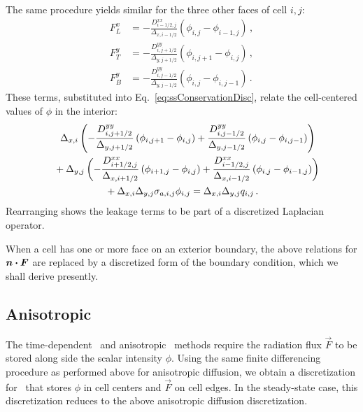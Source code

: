 The same procedure yields similar for the three other faces of cell $i,j$:
\begin{align*}
  F_L^x &= -\frac{D^{xx}_{i-1/2,j}}{\Delta_{x,i-1/2}}
  \left( \phi_{i,j} - \phi_{i-1,j} \right)\,,
  \\
  F_T^y &= -\frac{D^{yy}_{i,j+1/2}}{\Delta_{y,j+1/2}}
  \left( \phi_{i,j+1} - \phi_{i,j} \right)\,,
  \\
  F_B^y &= -\frac{D^{yy}_{i,j-1/2}}{\Delta_{y,j-1/2}}
  \left( \phi_{i,j} - \phi_{i,j-1} \right)\,.
\end{align*}
These terms, substituted into Eq.~\eqref{eq:ssConservationDisc}, relate the
cell-centered values of $\phi$ in the interior:
\begin{multline} \label{eq:diagConservation}
  \hphantom{ {}+{} }
  \Delta_{x,i} \left(
  - \frac{D^{yy}_{i,j+1/2}}{\Delta_{y,j+1/2}} \left( \phi_{i,j+1} - \phi_{i,j}
    \right)
  + \frac{D^{yy}_{i,j-1/2}}{\Delta_{y,j-1/2}} \left( \phi_{i,j} - \phi_{i,j-1}
    \right)
  \right)
\\
\shoveleft{%
  {}+ \Delta_{y,j} \left(
  - \frac{D^{xx}_{i+1/2,j}}{\Delta_{x,i+1/2}} \left( \phi_{i+1,j} - \phi_{i,j}
    \right)
  + \frac{D^{xx}_{i-1/2,j}}{\Delta_{x,i-1/2}} \left( \phi_{i,j} - \phi_{i-1,j}
    \right)
  \right)
}
\\
{}+ \Delta_{x,i}\Delta_{y,j} \sigma_{a,i,j} \phi_{i,j}
= \Delta_{x,i}\Delta_{y,j} q_{i,j}\,.
\end{multline}
Rearranging shows the leakage terms to be part of a discretized Laplacian
operator.

When a cell has one or more face on an exterior boundary, the above relations
for $\bm{n}\bm{\cdot} \bm{F}$ are replaced by a discretized form of the boundary
condition, which we shall derive presently.

\subsection{Anisotropic \texorpdfstring{\Pone}{P1}}

The time-dependent \Pone\ and anisotropic \Pone\ methods require the radiation
flux $\vec{F}$ to be stored along side the scalar intensity $\phi$. Using the
same finite differencing procedure as performed above for anisotropic diffusion,
we obtain a discretization for \APone\ that stores $\phi$ in cell centers and
$\vec{F}$ on cell edges.
In the steady-state case, this discretization reduces to the above anisotropic
diffusion discretization.

